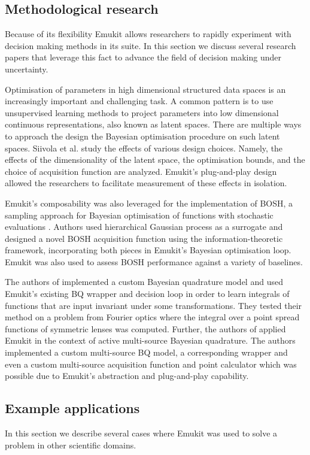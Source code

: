 \subsection{Methodological research}
Because of its flexibility Emukit allows researchers to rapidly experiment with decision making methods in its suite. In this section we discuss several research papers that leverage this fact to advance the field of decision making under uncertainty.

Optimisation of parameters in high dimensional structured data spaces is an increasingly important and challenging task. A common pattern is to use unsupervised learning methods to project parameters into low dimensional continuous representations, also known as latent spaces. There are multiple ways to approach the design the Bayesian optimisation procedure on such latent spaces. Siivola et al. \cite{siivola2021good} study the effects of various design choices. Namely, the effects of the dimensionality of the latent space, the optimisation bounds, and the choice of acquisition function are analyzed. Emukit's plug-and-play design allowed the researchers to facilitate measurement of these effects in isolation.

Emukit's composability was also leveraged for the implementation of BOSH, a sampling approach for Bayesian optimisation of functions with stochastic evaluations \cite{moss2020bosh}. Authors used hierarchical Gaussian process as a surrogate and designed a novel BOSH acquisition function using the information-theoretic framework, incorporating both pieces in Emukit's Bayesian optimisation loop. Emukit was also used to assess BOSH performance against a variety of baselines.

The authors of \cite{Naslidnyk21} implemented a custom Bayesian quadrature model and used Emukit's existing BQ wrapper and decision loop in order to learn integrals of functions that are input invariant under some transformations. They tested their method on a problem from Fourier optics where the integral over a point spread functions of symmetric lenses was computed. Further, the authors of \cite{Gessner20} applied Emukit in the context of active multi-source Bayesian quadrature. The authors implemented a custom multi-source BQ model, a corresponding wrapper and even a custom multi-source acquisition function and point calculator which was possible due to Emukit's abstraction and plug-and-play capability.

\subsection{Example applications}
In this section we describe several cases where Emukit was used to solve a problem in other scientific domains.

